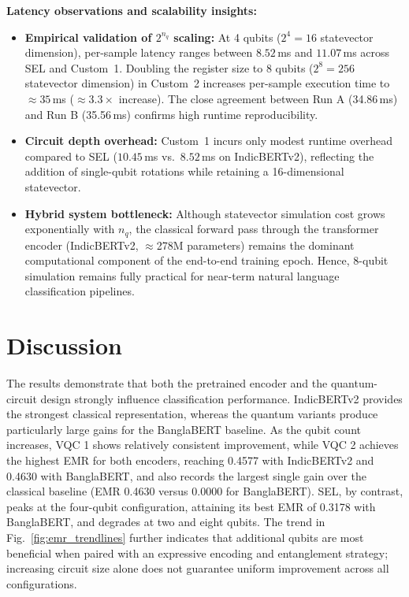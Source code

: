 \documentclass[runningheads]{llncs}
\begin{document}
\noindent\textbf{Latency observations and scalability insights:}
\begin{itemize}[leftmargin=*]
    \item \textbf{Empirical validation of $2^{n_q}$ scaling:} At 4 qubits ($2^4 = 16$ statevector dimension), per-sample latency ranges between $8.52$\,ms and $11.07$\,ms across SEL and Custom~1. Doubling the register size to 8 qubits ($2^8 = 256$ statevector dimension) in Custom~2 increases per-sample execution time to $\approx 35$\,ms ($\approx 3.3\times$ increase). The close agreement between Run A (34.86\,ms) and Run B (35.56\,ms) confirms high runtime reproducibility.
    \item \textbf{Circuit depth overhead:} Custom~1 incurs only modest runtime overhead compared to SEL ($10.45$\,ms vs.\ $8.52$\,ms on IndicBERTv2), reflecting the addition of single-qubit rotations while retaining a 16-dimensional statevector.
    \item \textbf{Hybrid system bottleneck:} Although statevector simulation cost grows exponentially with $n_q$, the classical forward pass through the transformer encoder (IndicBERTv2, $\approx$278M parameters) remains the dominant computational component of the end-to-end training epoch. Hence, 8-qubit simulation remains fully practical for near-term natural language classification pipelines.
\end{itemize}

\section{Discussion}\label{sec:discussion}
The results demonstrate that both the pretrained encoder and the quantum-circuit design strongly influence classification performance. IndicBERTv2 provides the strongest classical representation, whereas the quantum variants produce particularly large gains for the BanglaBERT baseline. As the qubit count increases, VQC 1 shows relatively consistent improvement, while VQC 2 achieves the highest EMR for both encoders, reaching 0.4577 with IndicBERTv2 and 0.4630 with BanglaBERT, and also records the largest single gain over the classical baseline (EMR 0.4630 versus 0.0000 for BanglaBERT). SEL, by contrast, peaks at the four-qubit configuration, attaining its best EMR of 0.3178 with BanglaBERT, and degrades at two and eight qubits. The trend in Fig.~\ref{fig:emr_trendlines} further indicates that additional qubits are most beneficial when paired with an expressive encoding and entanglement strategy; increasing circuit size alone does not guarantee uniform improvement across all configurations.
\end{document}
